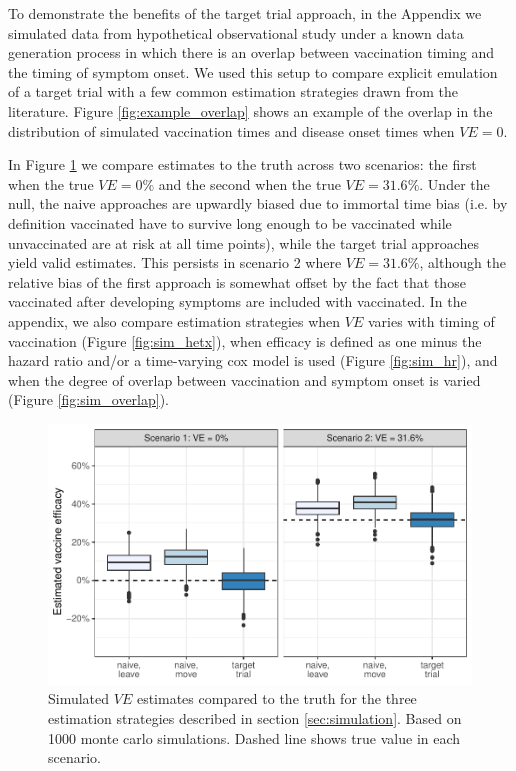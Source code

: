 \documentclass[11pt]{article}
\begin{document}
To demonstrate the benefits of the target trial approach, in the Appendix we simulated data from hypothetical observational study under a known data generation process in which there is an overlap between vaccination timing and the timing of symptom onset. We used this setup to compare explicit emulation of a target trial with a few common estimation strategies drawn from the literature. Figure \ref{fig:example_overlap} shows an example of the overlap in the distribution of simulated vaccination times and disease onset times when $VE = 0$.

In Figure \ref{fig:sim_results} we compare estimates to the truth across two scenarios: the first when the true $VE = 0\%$ and the second when the true $VE = 31.6\%$. Under the null, the naive approaches are upwardly biased due to immortal time bias (i.e. by definition vaccinated have to survive long enough to be vaccinated while unvaccinated are at risk at all time points), while the target trial approaches yield valid estimates. This persists in scenario 2 where $VE = 31.6\%$, although the relative bias of the first approach is somewhat offset by the fact that those vaccinated after developing symptoms are included with vaccinated. In the appendix, we also compare estimation strategies when $VE$ varies with timing of vaccination (Figure \ref{fig:sim_hetx}), when efficacy is defined as one minus the hazard ratio and/or a time-varying cox model is used (Figure \ref{fig:sim_hr}), and when the degree of overlap between vaccination and symptom onset is varied (Figure \ref{fig:sim_overlap}).


\begin{figure}[t]
  \centering
  \includegraphics{../../../../3_figures/sim_rr.pdf}
  \caption{Simulated $VE$ estimates compared to the truth for the three estimation strategies described in section \ref{sec:simulation}. Based on 1000 monte carlo simulations. Dashed line shows true value in each scenario. \label{fig:sim_results}}
  \end{figure}
\end{document}
